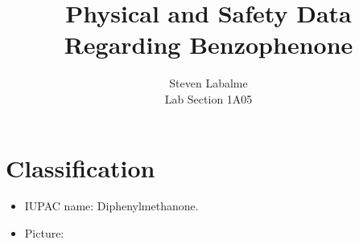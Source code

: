 \documentclass[titlepage]{article}
\title{Physical and Safety Data Regarding Benzophenone}
\author{
    Steven Labalme\\
    \normalsize Lab Section 1A05
}
\begin{document}
\maketitle



\pagestyle{main}
\renewcommand{\leftmark}{Lab Assignment 1a}
\section*{Classification}
\begin{itemize}
    \item IUPAC name: Diphenylmethanone.
    \item Picture:
    \begin{center}
    \end{center}
\end{itemize}



\end{document}
